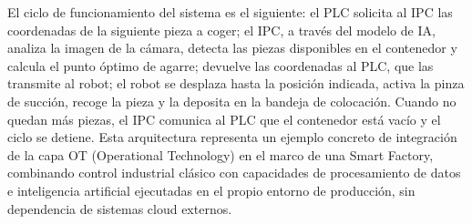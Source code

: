 
El ciclo de funcionamiento del sistema es el siguiente: el PLC solicita al IPC las coordenadas de la siguiente pieza a coger; el IPC, a través del modelo de IA, analiza la imagen de la cámara, detecta las piezas disponibles en el contenedor y calcula el punto óptimo de agarre; devuelve las coordenadas al PLC, que las transmite al robot; el robot se desplaza hasta la posición indicada, activa la pinza de succión, recoge la pieza y la deposita en la bandeja de colocación. Cuando no quedan más piezas, el IPC comunica al PLC que el contenedor está vacío y el ciclo se detiene.
Esta arquitectura representa un ejemplo concreto de integración de la capa OT (Operational Technology) en el marco de una Smart Factory, combinando control industrial clásico con capacidades de procesamiento de datos e inteligencia artificial ejecutadas en el propio entorno de producción, sin dependencia de sistemas cloud externos.
